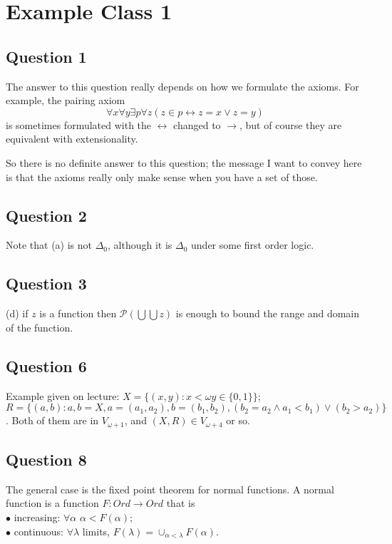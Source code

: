\documentclass[a4paper]{article}
\begin{document}
\newpage

\section{Example Class 1}

\subsection{Question 1}

The answer to this question really depends on how we formulate the axioms. For example, the pairing axiom
\[
    \forall x \forall y \exists p \forall z (z \in p \leftrightarrow z = x \vee z = y)
\]
is sometimes formulated with the $\leftrightarrow$ changed to $\to$, but of course they are equivalent with extensionality.

So there is no definite answer to this question; the message I want to convey here is that the axioms really only make sense when you have a set of those.

\subsection{Question 2}
Note that (a) is not $\Delta_0$, although it is $\Delta_0$ under some first order logic.

\subsection{Question 3}
(d) if $z$ is a function then $\mathcal{P}(\bigcup\bigcup z)$ is enough to bound the range and domain of the function.

\subsection{Question 6}
Example given on lecture: $X=\{(x,y): x< \omega y \in \{0,1\}\}$;\\
$R=\{(a,b) : a,b = X, a=(a_1,a_2), b=(b_1,b_2), (b_2=a_2 \wedge a_1<b_1) \vee (b_2 > a_2)\}$. Both of them are in $V_{\omega +1}$, and $(X,R) \in V_{\omega+4}$ or so.

\subsection{Question 8}
The general case is the fixed point theorem for normal functions. A normal function is a function $F:Ord \to Ord$ that is\\
$\bullet$ increasing: $\forall \alpha$ $\alpha < F(\alpha)$;\\
$\bullet$ continuous: $\forall \lambda$ limits, $F(\lambda) = \cup_{\alpha < \lambda} F(\alpha)$.
\end{document}
